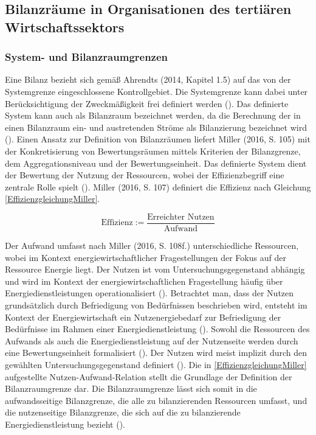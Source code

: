 \subsection{Bilanzräume in Organisationen des tertiären Wirtschaftssektors}


\subsubsection{System- und Bilanzraumgrenzen}
Eine Bilanz bezieht sich gemäß Ahrendts (2014, Kapitel 1.5) auf das von der Systemgrenze eingeschlossene Kontrollgebiet. Die Systemgrenze kann dabei unter Berücksichtigung 
der Zweckmäßigkeit frei definiert werden (\cite[Kapitel 1.5]{Ahrendts.2014}).
Das definierte System kann auch als Bilanzraum bezeichnet werden, da die Berechnung der in einen Bilanzraum ein- und austretenden Ströme als Bilanzierung bezeichnet wird 
(\cite[S. 65]{Rönsch.2015}).
Einen Ansatz zur Definition von Bilanzräumen liefert Miller (2016, S. 105) mit der Konkretisierung von Bewertungsräumen mittels Kriterien der Bilanzgrenze, dem 
Aggregationsniveau und der Bewertungseinheit. Das definierte System dient der Bewertung der Nutzung der Ressourcen, wobei der Effizienzbegriff eine zentrale Rolle spielt 
(\cite[S. 107]{Miller.2016}).
Miller (2016, S. 107) definiert die Effizienz nach Gleichung \eqref{EffizienzgleichungMiller}.

\begin{equation}
    \text{Effizienz} := \frac{\text{Erreichter Nutzen}}{\text{Aufwand}}
    \label{EffizienzgleichungMiller}
\end{equation}

Der Aufwand umfasst nach Miller (2016, S. 108f.) unterschiedliche Ressourcen, wobei im Kontext energiewirtschaftlicher Fragestellungen der Fokus auf der Ressource Energie liegt.
Der Nutzen ist vom Untersuchungsgegenstand abhängig und wird im Kontext der energiewirtschaftlichen Fragestellung häufig über Energiedienstleistungen operationalisiert (\cite[S. 107]{Miller.2016}). Betrachtet man, dass der Nutzen grundsätzlich durch Befriedigung von Bedürfnissen beschrieben wird, entsteht im Kontext der Energiewirtschaft ein Nutzenergiebedarf zur Befriedigung der Bedürfnisse im Rahmen einer Energiedienstleistung (\cite[S. 107]{Miller.2016}).
Sowohl die Ressourcen des Aufwands als auch die Energiedienstleistung auf der Nutzenseite werden durch eine Bewertungseinheit formalisiert (\cite{Miller.2016}).
Der Nutzen wird meist implizit durch den gewählten Untersuchungsgegenstand definiert (\cite[S. 110]{Miller.2016}).
Die in \eqref{EffizienzgleichungMiller} aufgestellte Nutzen-Aufwand-Relation stellt die Grundlage der Definition der Bilanzraumgrenze dar.
Die Bilanzraumgrenze lässt sich somit in die aufwandsseitige Bilanzgrenze, die alle zu bilanzierenden Ressourcen umfasst, und die nutzenseitige Bilanzgrenze, die sich auf die zu bilanzierende Energiedienstleistung bezieht (\cite[S. 111]{Miller.2016}).

